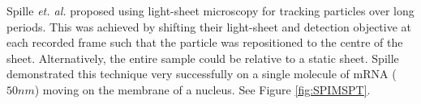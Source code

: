Spille \emph{et. al.} proposed using light-sheet microscopy for tracking particles over long periods.
This was achieved by shifting their light-sheet and detection objective at each recorded frame such that the particle was repositioned to the centre of the sheet.
Alternatively, the entire sample could be relative to a static sheet.
Spille demonstrated this technique very successfully on a single molecule of mRNA (\(50 nm\)\cite{Spille2015a}) moving on the membrane of a nucleus\cite{Spille2015a}.
See Figure \ref{fig:SPIMSPT}.
%
%
%
%



